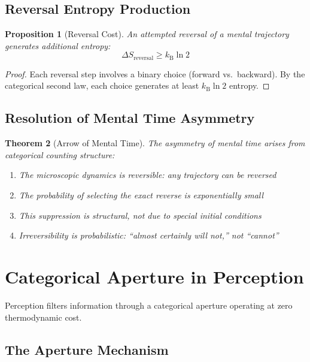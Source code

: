 \documentclass[aps,prd,twocolumn,superscriptaddress,floatfix,nofootinbib]{revtex4-2}
\newtheorem{theorem}{Theorem}[section]
\newtheorem{proposition}[theorem]{Proposition}
\theoremstyle{remark}
\newcommand{\kB}{k_{\mathrm{B}}}
\begin{document}
\subsection{Reversal Entropy Production}

\begin{proposition}[Reversal Cost]
\label{prop:reversal_cost}
An attempted reversal of a mental trajectory generates additional entropy:
\begin{equation}
\Delta S_{\text{reversal}} \geq \kB \ln 2
\end{equation}
\end{proposition}

\begin{proof}
Each reversal step involves a binary choice (forward vs.\ backward). By the categorical second law, each choice generates at least $\kB \ln 2$ entropy.
\end{proof}

\subsection{Resolution of Mental Time Asymmetry}

\begin{theorem}[Arrow of Mental Time]
\label{thm:arrow_mental_time}
The asymmetry of mental time arises from categorical counting structure:
\begin{enumerate}
\item The microscopic dynamics is reversible: any trajectory can be reversed
\item The probability of selecting the exact reverse is exponentially small
\item This suppression is structural, not due to special initial conditions
\item Irreversibility is probabilistic: ``almost certainly will not,'' not ``cannot''
\end{enumerate}
\end{theorem}

\section{Categorical Aperture in Perception}
\label{sec:aperture}

Perception filters information through a categorical aperture operating at zero thermodynamic cost.

\subsection{The Aperture Mechanism}
\end{document}
